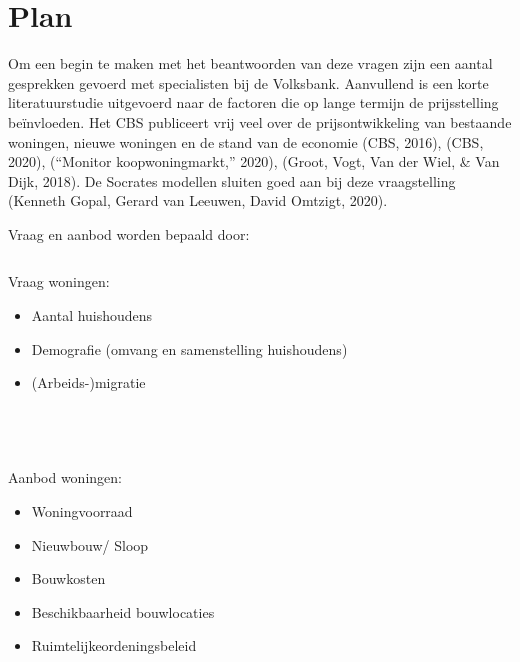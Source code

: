 \documentclass[
]{article}
\providecommand{\tightlist}{%
  \setlength{\itemsep}{0pt}\setlength{\parskip}{0pt}}
\begin{document}
\hypertarget{plan}{%
\section{Plan}\label{plan}}

Om een begin te maken met het beantwoorden van deze vragen zijn een
aantal gesprekken gevoerd met specialisten bij de Volksbank. Aanvullend
is een korte literatuurstudie uitgevoerd naar de factoren die op lange
termijn de prijsstelling beïnvloeden. Het CBS publiceert vrij veel over
de prijsontwikkeling van bestaande woningen, nieuwe woningen en de stand
van de economie (CBS, 2016), (CBS, 2020), (``Monitor koopwoningmarkt,''
2020), (Groot, Vogt, Van der Wiel, \& Van Dijk, 2018). De Socrates
modellen sluiten goed aan bij deze vraagstelling (Kenneth Gopal, Gerard
van Leeuwen, David Omtzigt, 2020).

Vraag en aanbod worden bepaald door:

\begin{column}{0.48\textwidth}

Vraag woningen:

\begin{itemize}
\tightlist
\item
  Aantal huishoudens
\item
  Demografie (omvang en samenstelling huishoudens)
\item
  (Arbeids-)migratie
\end{itemize}


\end{column}

\begin{column}{0.04\textwidth}
~

\end{column}

\begin{column}{0.48\textwidth}

Aanbod woningen:

\begin{itemize}
\tightlist
\item
  Woningvoorraad
\item
  Nieuwbouw/ Sloop
\item
  Bouwkosten
\item
  Beschikbaarheid bouwlocaties
\item
  Ruimtelijkeordeningsbeleid
\end{itemize}


\end{column}
\end{document}

